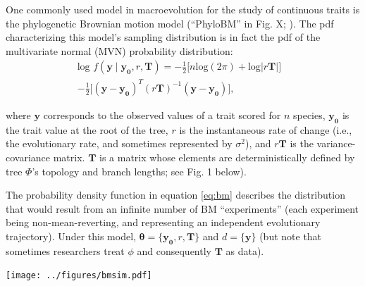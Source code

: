 \documentclass[oneside]{article}
\begin{document}
\begin{tcolorbox}[breakable, width=\textwidth, colback=gray!10, boxrule=0pt,
  title=Box 1: Models characterized by well-known parametric distributions, fonttitle=\bfseries]
  \small 
  One commonly used model in macroevolution for the study of continuous traits is the phylogenetic Brownian motion model (``PhyloBM'' in Fig. X; \citealt{felsenstein73}).
The pdf characterizing this model's sampling distribution is in fact the pdf of the multivariate normal (MVN) probability distribution:
\begin{equation}
  \begin{split}
    \text{log }f(\boldsymbol{y} \mid \boldsymbol{y_0}, r, \boldsymbol{T}) = -\frac{1}{2} \Big[ n\text{log}(2\pi) + \text{log}|r \boldsymbol{T}| \Big] & \\
    -\frac{1}{2} \Big[ (\mathbf{y} - \boldsymbol{y_0})^T (r \boldsymbol{T})^{-1} (\mathbf{y} - \boldsymbol{y_0}) \Big],
  \label{eq:bm}
  \end{split}
\end{equation}

\noindent where $\boldsymbol{y}$ corresponds to the observed values of a trait scored for $n$ species, $\boldsymbol{y_0}$ is the trait value at the root of the tree, $r$ is the instantaneous rate of change (i.e., the evolutionary rate, and sometimes represented by $\sigma^2$), and $r\boldsymbol{T}$ is the variance-covariance matrix.
$\boldsymbol{T}$ is a matrix whose elements are deterministically defined by tree $\Phi$'s topology and branch lengths; see Fig. 1 below).

\vspace{.25cm}
The probability density function in equation \eqref{eq:bm} describes the distribution
that would result from an infinite number of BM ``experiments'' (each experiment
being non-mean-reverting, and representing an independent evolutionary trajectory).
Under this model, $\boldsymbol{\theta} = \{\boldsymbol{y_0}, r, \boldsymbol{T}\}$ and
$d = \{\boldsymbol{y}\}$ (but note that sometimes researchers treat $\phi$ and
consequently $\boldsymbol{T}$ as
data).

\begin{center}
\texttt{[image: ../figures/bmsim.pdf]}
\label{fig:bmsim}
\end{center}


\end{tcolorbox}
\end{document}
